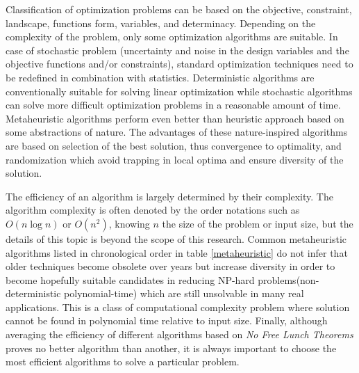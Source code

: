 Classification of optimization problems can be based on the objective, constraint, landscape, functions form, variables, and determinacy. Depending on the complexity of the problem, only some optimization algorithms are suitable. In case of stochastic problem (uncertainty and noise in the design variables and the objective functions and/or constraints), standard optimization techniques need to be redefined in combination with statistics. Deterministic algorithms are conventionally suitable for solving linear optimization while stochastic algorithms can solve more difficult optimization problems in a reasonable amount of time. Metaheuristic algorithms perform even better than heuristic approach based on some abstractions of nature. The advantages of these nature-inspired algorithms are based on selection of the best solution, thus convergence to optimality, and randomization which avoid trapping in local optima and ensure diversity of the solution. 

The efficiency of an algorithm is largely determined by their complexity. The algorithm complexity is often denoted by the order notations such as $O(n\log{n})$ or $O(n^2)$, knowing $n$ the size of the problem or input size, but the details of this topic is beyond the scope of this research. Common metaheuristic algorithms listed in chronological order in table \ref{metaheuristic} do not infer that older techniques become obsolete over years but increase diversity in order to become hopefully suitable candidates in reducing NP-hard problems(non-deterministic polynomial-time) which are still unsolvable in many real applications. This is a class of computational complexity problem where solution cannot be found in polynomial time relative to input size. 
Finally, although averaging the efficiency of different algorithms based on \emph{No Free Lunch Theorems} proves no better algorithm than another, it is always important to choose the most efficient algorithms to solve a particular problem. 


